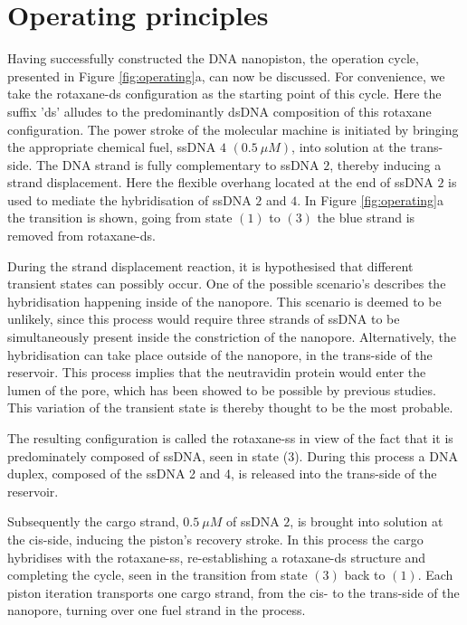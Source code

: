 \section{Operating principles}

Having successfully constructed the DNA nanopiston, the operation cycle, presented in
Figure \ref{fig:operating}a, can now be discussed. For convenience, we take the
rotaxane-ds configuration as the starting
point of this cycle. Here the suffix ’ds’ alludes to the predominantly dsDNA composition
of this rotaxane configuration. The power stroke of the molecular machine is initiated by
bringing the appropriate chemical fuel, ssDNA $4$ $(0.5\ \mu M)$, into solution at the
trans-side.
The DNA strand is fully complementary to ssDNA $2$, thereby inducing a strand
displacement. Here the flexible overhang located at the end of ssDNA $2$ is used to
mediate the hybridisation of ssDNA $2$ and $4$. In Figure \ref{fig:operating}a the
transition is shown, going from state $(1)$ to $(3)$ the blue strand is removed from
rotaxane-ds.

During the strand displacement reaction, it is hypothesised that different transient
states can possibly occur. One of the possible scenario's describes the hybridisation
happening inside of the nanopore. This scenario is deemed to be unlikely, since this
process would require three strands of ssDNA to be simultaneously present inside the
constriction of the nanopore. Alternatively, the hybridisation can take place outside of
the nanopore, in the trans-side of the reservoir. This process implies that the
neutravidin protein would enter the lumen of the pore, which has been showed to be
possible by previous studies. \cite{Lu2018} This variation of the transient state is
thereby thought to be the most probable.

The resulting configuration is called the rotaxane-ss in view of the fact that it is
predominately composed of ssDNA, seen in state (3). During this process a DNA duplex,
composed of
the ssDNA 2 and 4, is released into the trans-side of the reservoir.

Subsequently the cargo strand, $0.5\ \mu M$ of ssDNA $2$,  is brought into solution at
the cis-side, inducing the piston's recovery stroke. In this process the cargo hybridises
with the rotaxane-ss, re-establishing a rotaxane-ds structure and completing the cycle,
seen in the transition from state $(3)$ back to $(1)$.
Each piston iteration transports one cargo strand, from the cis- to the trans-side of
the nanopore, turning over one fuel strand in the process.

